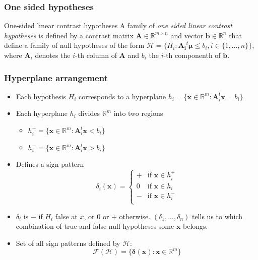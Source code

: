 \documentclass[bigger]{beamer}
\newcommand{\bs}[1]{\bm{#1}}
\newcommand{\R}{\mathbb{R}}
\begin{document}
\begin{frame}
 \frametitle{One sided hypotheses}
 \begin{block}{One-sided linear contrast hypotheses}
   A family of {\em one sided linear contrast hypotheses} is defined
   by a contrast matrix $\bs{A} \in \mathbb{R}^{m\times n}$ and
   vector $\bs{b} \in \mathbb{R}^n$ that define a  family of null
   hypotheses of the form $\mathscr{H} = \{H_i: \bs{A_i}^t\bs{\mu}
   \leq b_i,i \in \{1,...,n\}\}$, where $\bs{A}_i$ denotes the $i$-th
   column of $\bs{A}$ and $b_i$ the $i$-th componenth of $\bs{b}$.
 \end{block}
\end{frame}

\begin{frame}
 \frametitle{Hyperplane arrangement}
 \begin{itemize}
 \item Each hypothesis $H_i$ corresponds to a hyperplane $h_i =
   \{\bs{x} \in \mathbb{R}^m: \bs{A}_i^t\bs{x} = b_i\}$
 \item Each hyperplane $h_i$ divides $\mathbb{R}^m$ into two regions
   \begin{itemize}
   \item $h_i^+ = \{\bs{x} \in \mathbb{R}^m: \bs{A}_i^t\bs{x} <
     b_i\}$
   \item $h_i^- = \{\bs{x} \in \mathbb{R}^m: \bs{A}_i^t\bs{x}
     > b_i\}$
   \end{itemize}
 \item Defines a sign pattern
   \begin{equation}
     \label{eq:sign}
     \delta_i(\bs{x}) = \left\{
       \begin{array}{ll}
         + & \text{if } \bs{x} \in h_i^+\\
         0 & \text{if } \bs{x} \in h_i \\
         - & \text{if } \bs{x} \in h_i^-\\
       \end{array}\right.
   \end{equation}
 \item $\delta_i$ is $-$ if $H_i$ false at $x$, or $0$ or $+$
   otherwise. $(\delta_1,...,\delta_n)$ tells us to which combination
   of true and false null hypotheses some $\bs{x}$ belongs.

 \item Set of all sign patterns defined by $\mathscr{H}$:
   \begin{equation}
     \label{eq:faces}
     \mathcal{F}(\mathscr{H}) = \{\bs{\delta}(\bs{x}): \bs{x} \in \R^m\}
   \end{equation}
 \end{itemize}
\end{frame}
\end{document}
